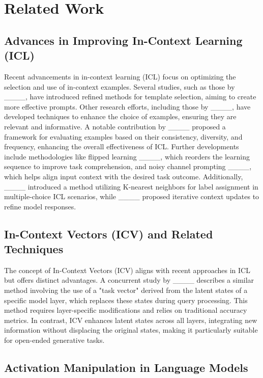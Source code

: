 \section{Related Work}
\subsection{Advances in Improving In-Context Learning (ICL)}

Recent advancements in in-context learning (ICL) focus on optimizing the selection and use of in-context examples. Several studies, such as those by ____, have introduced refined methods for template selection, aiming to create more effective prompts. Other research efforts, including those by ____, have developed techniques to enhance the choice of examples, ensuring they are relevant and informative. A notable contribution by ____ proposed a framework for evaluating examples based on their consistency, diversity, and frequency, enhancing the overall effectiveness of ICL. Further developments include methodologies like flipped learning ____, which reorders the learning sequence to improve task comprehension, and noisy channel prompting ____, which helps align input context with the desired task outcome. Additionally, ____ introduced a method utilizing K-nearest neighbors for label assignment in multiple-choice ICL scenarios, while ____ proposed iterative context updates to refine model responses. 

\subsection{In-Context Vectors (ICV) and Related Techniques}

The concept of In-Context Vectors (ICV) aligns with recent approaches in ICL but offers distinct advantages. A concurrent study by ____ describes a similar method involving the use of a "task vector" derived from the latent states of a specific model layer, which replaces these states during query processing. This method requires layer-specific modifications and relies on traditional accuracy metrics. In contrast, ICV enhances latent states across all layers, integrating new information without displacing the original states, making it particularly suitable for open-ended generative tasks.

\subsection{Activation Manipulation in Language Models}

